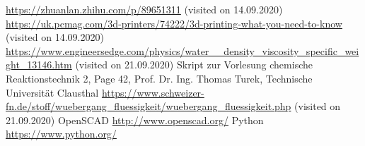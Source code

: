\documentclass[journal,article,processes,submit,moreauthors,pdftex]{Definitions/mdpi}
\begin{document}





\begin{thebibliography}{999}
\url{https://zhuanlan.zhihu.com/p/89651311} (visited on 14.09.2020)
\url{https://uk.pcmag.com/3d-printers/74222/3d-printing-what-you-need-to-know} (visited on 14.09.2020)
\url{https://www.engineersedge.com/physics/water\_\_density\_viscosity\_specific\_weight\_13146.htm} (visited on 21.09.2020)
Skript zur Vorlesung chemische Reaktionstechnik 2, Page 42, Prof. Dr. Ing. Thomas Turek, Technische Universität Clausthal
\url{https://www.schweizer-fn.de/stoff/wuebergang_fluessigkeit/wuebergang_fluessigkeit.php} (visited on 21.09.2020)
OpenSCAD \url{http://www.openscad.org/}
Python \url{https://www.python.org/}
\end{thebibliography}



\end{document}
